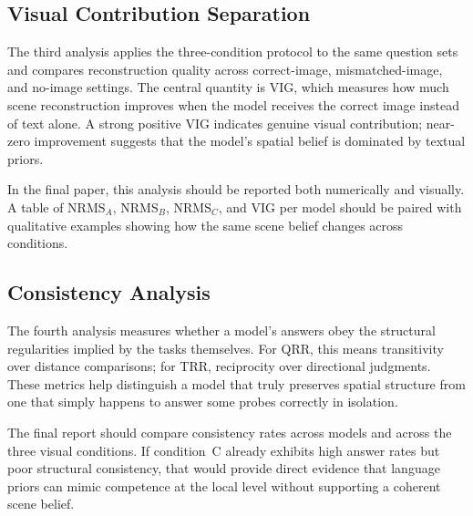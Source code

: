 \subsection{Visual Contribution Separation}
\label{sec:exp-vig}

The third analysis applies the three-condition protocol to the same question sets and compares reconstruction quality across correct-image, mismatched-image, and no-image settings. The central quantity is VIG, which measures how much scene reconstruction improves when the model receives the correct image instead of text alone. A strong positive VIG indicates genuine visual contribution; near-zero improvement suggests that the model's spatial belief is dominated by textual priors.

In the final paper, this analysis should be reported both numerically and visually. A table of $\mathrm{NRMS}_A$, $\mathrm{NRMS}_B$, $\mathrm{NRMS}_C$, and VIG per model should be paired with qualitative examples showing how the same scene belief changes across conditions.

\subsection{Consistency Analysis}
\label{sec:exp-consistency}

The fourth analysis measures whether a model's answers obey the structural regularities implied by the tasks themselves. For QRR, this means transitivity over distance comparisons; for TRR, reciprocity over directional judgments. These metrics help distinguish a model that truly preserves spatial structure from one that simply happens to answer some probes correctly in isolation.

The final report should compare consistency rates across models and across the three visual conditions. If condition~C already exhibits high answer rates but poor structural consistency, that would provide direct evidence that language priors can mimic competence at the local level without supporting a coherent scene belief.
